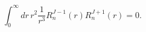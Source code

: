 \begin{equation}
\int_{0}^{\infty }dr\,r^{2}\frac{1}{r^{3}}R_{n}^{J-1}\left( r\right)
R_{n}^{J+1}\left( r\right) =0.
\end{equation}

